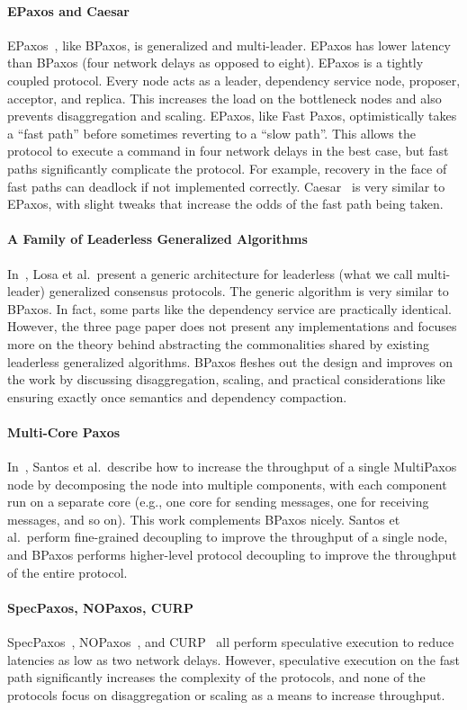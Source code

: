 \paragraph{EPaxos and Caesar}
EPaxos~\cite{moraru2013there, moraru2013proof}, like BPaxos, is generalized and
multi-leader. EPaxos has lower latency than BPaxos (four network delays as
opposed to eight). EPaxos is a tightly coupled protocol. Every node acts as a
leader, dependency service node, proposer, acceptor, and replica. This
increases the load on the bottleneck nodes and also prevents disaggregation and
scaling. EPaxos, like Fast Paxos, optimistically takes a ``fast path'' before
sometimes reverting to a ``slow path''. This allows the protocol to execute a
command in four network delays in the best case, but fast paths significantly
complicate the protocol. For example, recovery in the face of fast paths can
deadlock if not implemented correctly. Caesar~\cite{arun2017speeding} is very
similar to EPaxos, with slight tweaks that increase the odds of the fast path
being taken.

\paragraph{A Family of Leaderless Generalized Algorithms}
In~\cite{losa2016brief}, Losa et al.\ present a generic architecture for
leaderless (what we call multi-leader) generalized consensus protocols. The
generic algorithm is very similar to BPaxos. In fact, some parts like the
dependency service are practically identical. However, the three page paper
does not present any implementations and focuses more on the theory behind
abstracting the commonalities shared by existing leaderless generalized
algorithms. BPaxos fleshes out the design and improves on the work by
discussing disaggregation, scaling, and practical considerations like ensuring
exactly once semantics and dependency compaction.

\paragraph{Multi-Core Paxos}
In~\cite{santos2013achieving}, Santos et al.\ describe how to increase the
throughput of a single MultiPaxos node by decomposing the node into multiple
components, with each component run on a separate core (e.g., one core for
sending messages, one for receiving messages, and so on). This work complements
BPaxos nicely. Santos et al.\ perform fine-grained decoupling to improve the
throughput of a single node, and BPaxos performs higher-level protocol
decoupling to improve the throughput of the entire protocol.

\paragraph{SpecPaxos, NOPaxos, CURP}
SpecPaxos~\cite{ports2015designing}, NOPaxos~\cite{li2016just}, and
CURP~\cite{park2019exploiting} all perform speculative execution to reduce
latencies as low as two network delays. However, speculative execution on the
fast path significantly increases the complexity of the protocols, and none of
the protocols focus on disaggregation or scaling as a means to increase
throughput.
